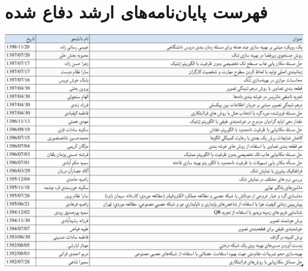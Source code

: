 \documentclass[11pt,a4paper]{bidimoderncv}
\begin{document}
\section{فهرست پایان‌نامه‌های ارشد دفاع شده}
\centering
\includegraphics[width=1\linewidth]{MSc-Projects.png}
\end{document}
